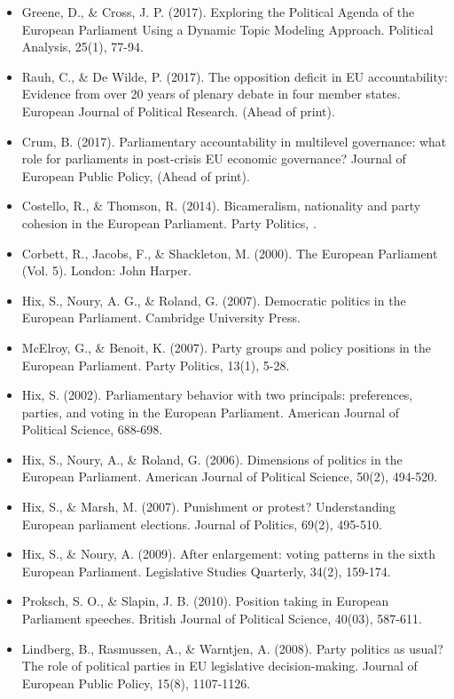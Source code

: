 \begin{itemize}
	\item Greene, D., \& Cross, J. P. (2017). Exploring the Political Agenda of the European Parliament Using a Dynamic Topic Modeling Approach. Political Analysis, 25(1), 77-94.
	\item Rauh, C., \& De Wilde, P. (2017). The opposition deficit in EU accountability: Evidence from over 20 years of plenary debate in four member states. European Journal of Political Research. (Ahead of print).
	\item Crum, B. (2017). Parliamentary accountability in multilevel governance: what role for parliaments in post-crisis EU economic governance? Journal of European Public Policy, (Ahead of print).
	\item Costello, R., \& Thomson, R. (2014). Bicameralism, nationality and party cohesion in the European Parliament. Party Politics, .
	\item Corbett, R., Jacobs, F., \& Shackleton, M. (2000). The European Parliament (Vol. 5). London: John Harper.
	\item Hix, S., Noury, A. G., \& Roland, G. (2007). Democratic politics in the European Parliament. Cambridge University Press.
	\item McElroy, G., \& Benoit, K. (2007). Party groups and policy positions in the European Parliament. Party Politics, 13(1), 5-28.
	\item Hix, S. (2002). Parliamentary behavior with two principals: preferences, parties, and voting in the European Parliament. American Journal of Political Science, 688-698.
	\item Hix, S., Noury, A., \& Roland, G. (2006). Dimensions of politics in the European Parliament. American Journal of Political Science, 50(2), 494-520.
	\item Hix, S., \& Marsh, M. (2007). Punishment or protest? Understanding European parliament elections. Journal of Politics, 69(2), 495-510.
	\item Hix, S., \& Noury, A. (2009). After enlargement: voting patterns in the sixth European Parliament. Legislative Studies Quarterly, 34(2), 159-174.
	\item Proksch, S. O., \& Slapin, J. B. (2010). Position taking in European Parliament speeches. British Journal of Political Science, 40(03), 587-611.
	\item Lindberg, B., Rasmussen, A., \& Warntjen, A. (2008). Party politics as usual? The role of political parties in EU legislative decision-making. Journal of European Public Policy, 15(8), 1107-1126.

\end{itemize}
